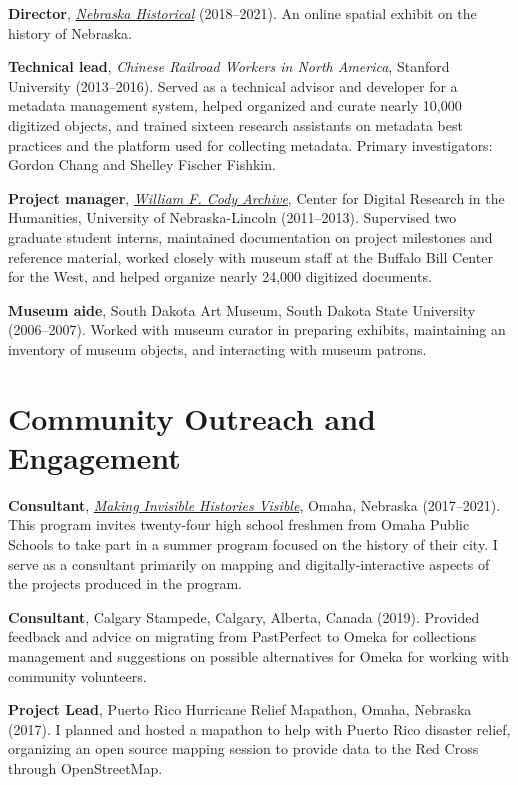 \textbf{Director}, \emph{\href{https://omahahistorical.org}{Nebraska
Historical}} (2018--2021). An online spatial exhibit on the history of
Nebraska.

\textbf{Technical lead}, \emph{Chinese Railroad Workers in North
America}, Stanford University (2013--2016). Served as a technical
advisor and developer for a metadata management system, helped organized
and curate nearly 10,000 digitized objects, and trained sixteen research
assistants on metadata best practices and the platform used for
collecting metadata. Primary investigators: Gordon Chang and Shelley
Fischer Fishkin.

\textbf{Project manager}, \emph{\href{http://codyarchive.org}{William F.
Cody Archive}}, Center for Digital Research in the Humanities,
University of Nebraska-Lincoln (2011--2013). Supervised two graduate
student interns, maintained documentation on project milestones and
reference material, worked closely with museum staff at the Buffalo Bill
Center for the West, and helped organize nearly 24,000 digitized
documents.

\textbf{Museum aide}, South Dakota Art Museum, South Dakota State
University (2006--2007). Worked with museum curator in preparing
exhibits, maintaining an inventory of museum objects, and interacting
with museum patrons.

\section{Community Outreach and
Engagement}\label{community-outreach-and-engagement}

\textbf{Consultant}, \emph{\href{http://invisiblehistory.ops.org}{Making
Invisible Histories Visible}}, Omaha, Nebraska (2017--2021). This
program invites twenty-four high school freshmen from Omaha Public
Schools to take part in a summer program focused on the history of their
city. I serve as a consultant primarily on mapping and
digitally-interactive aspects of the projects produced in the program.

\textbf{Consultant}, Calgary Stampede, Calgary, Alberta, Canada (2019).
Provided feedback and advice on migrating from PastPerfect to Omeka for
collections management and suggestions on possible alternatives for
Omeka for working with community volunteers.

\textbf{Project Lead}, Puerto Rico Hurricane Relief Mapathon, Omaha,
Nebraska (2017). I planned and hosted a mapathon to help with Puerto
Rico disaster relief, organizing an open source mapping session to
provide data to the Red Cross through OpenStreetMap.

